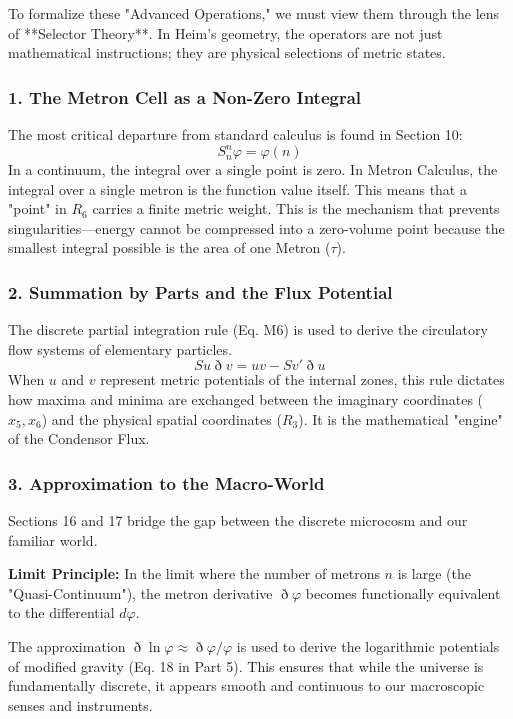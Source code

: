 \documentclass[11pt,a4paper,oneside]{article}
\begin{document}
To formalize these "Advanced Operations," we must view them through the lens of **Selector Theory**. In Heim's geometry, the operators are not just mathematical instructions; they are physical selections of metric states.

\subsubsection*{1. The Metron Cell as a Non-Zero Integral}
The most critical departure from standard calculus is found in Section 10:
\begin{equation}
    S_n^n \varphi = \varphi(n)
\end{equation}
In a continuum, the integral over a single point is zero. In Metron Calculus, the integral over a single metron is the function value itself. This means that a "point" in $R_6$ carries a finite metric weight. This is the mechanism that prevents singularities—energy cannot be compressed into a zero-volume point because the smallest integral possible is the area of one Metron ($\tau$).

\subsubsection*{2. Summation by Parts and the Flux Potential}
The discrete partial integration rule (Eq. M6) is used to derive the circulatory flow systems of elementary particles.
\begin{equation}
    S u \eth v = uv - S v' \eth u
\end{equation}
When $u$ and $v$ represent metric potentials of the internal zones, this rule dictates how maxima and minima are exchanged between the imaginary coordinates ($x_5, x_6$) and the physical spatial coordinates ($R_3$). It is the mathematical "engine" of the Condensor Flux.

\subsubsection*{3. Approximation to the Macro-World}
Sections 16 and 17 bridge the gap between the discrete microcosm and our familiar world.
\begin{mbbcite}
    \textbf{Limit Principle:} In the limit where the number of metrons $n$ is large (the "Quasi-Continuum"), the metron derivative $\eth \varphi$ becomes functionally equivalent to the differential $d\varphi$.
\end{mbbcite}
The approximation $\eth \ln \varphi \approx \eth \varphi / \varphi$ is used to derive the logarithmic potentials of modified gravity (Eq. 18 in Part 5). This ensures that while the universe is fundamentally discrete, it appears smooth and continuous to our macroscopic senses and instruments. 
\end{document}
